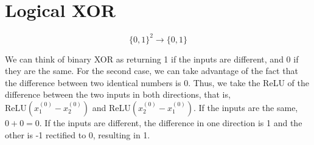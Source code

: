 \documentclass{article}
\newcommand{\relu}{\mathrm{ReLU}}
\newcommand{\DrawNeuron}[5]{%
  \node[neuron] (#1) at #2 {};
  \node[vect]   at ($(#1.center)+(-0.5,0)$) {#4};
  \draw         ($(#1.center)+(0.2,1.2cm)$)--($(#1.center)+(0.2,-1.2cm)$);
  \node[actlabel]at ($(#1.center)+(0.9,0)$) {#5};
  \node[above=0pt of #1] {#3};
}
\begin{document}
\begin{center}
\end{center}

\section{Logical XOR}

\[
  \{0,1\}^2 \to \{0,1\}
\] 

We can think of binary XOR as returning 1 if the inputs are
different, and 0 if they are the same. For the second case, we can
take advantage of the fact that the difference between two identical
numbers is 0. Thus, we take the ReLU of the difference between the
two inputs in both directions, that is, $\relu\left( x^{(0)}_1 -
x^{(0)}_2 \right)$ and $\relu\left( x^{(0)}_2 - x^{(0)}_1 \right)$.
If the inputs are the same, $0+0=0$. If the inputs are different, the
difference in one direction is 1 and the other is -1 rectified to 0,
resulting in 1.
\end{document}
